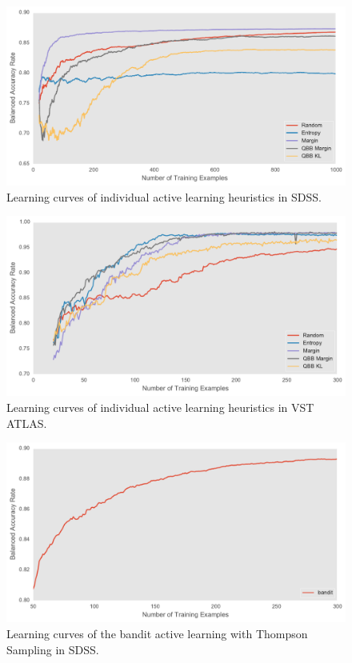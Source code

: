 \begin{figure}[tbp]
	\centering
	\includegraphics[width=\textwidth]{figures/lc_active_logistic_balanced}
	\caption{Learning curves of individual active learning heuristics in SDSS.}
	\label{fig:lc_active_logistic_balanced} 
\end{figure}

\begin{figure}[tbp]
	\centering
	\includegraphics[width=\textwidth]{figures/active_heuristics_lc_vst}
	\caption{Learning curves of individual active learning heuristics in VST ATLAS.}
	\label{fig:active_heuristics_lc_vst} 
\end{figure}

\begin{figure}[tbp]
	\centering
	\includegraphics[width=\textwidth]{figures/bandit_lc_sdss}
	\caption{Learning curves of the bandit active learning with Thompson Sampling in SDSS.}
	\label{fig:bandit_lc_sdss} 
\end{figure}

